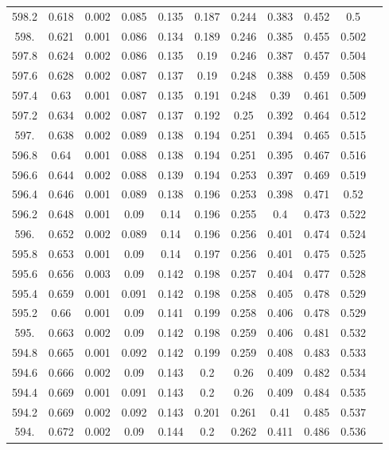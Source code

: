 \documentclass[12pt]{ctexart}
\numberwithin{equation}{section}
\begin{document}
\begin{longtable}{ccccccccccc}
598.2	&	0.618	&	0.002	&	0.085	&	0.135	&	0.187	&	0.244	&	0.383	&	0.452	&	0.5	\\
598.	&	0.621	&	0.001	&	0.086	&	0.134	&	0.189	&	0.246	&	0.385	&	0.455	&	0.502	\\
597.8	&	0.624	&	0.002	&	0.086	&	0.135	&	0.19	&	0.246	&	0.387	&	0.457	&	0.504	\\
597.6	&	0.628	&	0.002	&	0.087	&	0.137	&	0.19	&	0.248	&	0.388	&	0.459	&	0.508	\\
597.4	&	0.63	&	0.001	&	0.087	&	0.135	&	0.191	&	0.248	&	0.39	&	0.461	&	0.509	\\
597.2	&	0.634	&	0.002	&	0.087	&	0.137	&	0.192	&	0.25	&	0.392	&	0.464	&	0.512	\\
597.	&	0.638	&	0.002	&	0.089	&	0.138	&	0.194	&	0.251	&	0.394	&	0.465	&	0.515	\\
596.8	&	0.64	&	0.001	&	0.088	&	0.138	&	0.194	&	0.251	&	0.395	&	0.467	&	0.516	\\
596.6	&	0.644	&	0.002	&	0.088	&	0.139	&	0.194	&	0.253	&	0.397	&	0.469	&	0.519	\\
596.4	&	0.646	&	0.001	&	0.089	&	0.138	&	0.196	&	0.253	&	0.398	&	0.471	&	0.52	\\
596.2	&	0.648	&	0.001	&	0.09	&	0.14	&	0.196	&	0.255	&	0.4	&	0.473	&	0.522	\\
596.	&	0.652	&	0.002	&	0.089	&	0.14	&	0.196	&	0.256	&	0.401	&	0.474	&	0.524	\\
595.8	&	0.653	&	0.001	&	0.09	&	0.14	&	0.197	&	0.256	&	0.401	&	0.475	&	0.525	\\
595.6	&	0.656	&	0.003	&	0.09	&	0.142	&	0.198	&	0.257	&	0.404	&	0.477	&	0.528	\\
595.4	&	0.659	&	0.001	&	0.091	&	0.142	&	0.198	&	0.258	&	0.405	&	0.478	&	0.529	\\
595.2	&	0.66	&	0.001	&	0.09	&	0.141	&	0.199	&	0.258	&	0.406	&	0.478	&	0.529	\\
595.	&	0.663	&	0.002	&	0.09	&	0.142	&	0.198	&	0.259	&	0.406	&	0.481	&	0.532	\\
594.8	&	0.665	&	0.001	&	0.092	&	0.142	&	0.199	&	0.259	&	0.408	&	0.483	&	0.533	\\
594.6	&	0.666	&	0.002	&	0.09	&	0.143	&	0.2	&	0.26	&	0.409	&	0.482	&	0.534	\\
594.4	&	0.669	&	0.001	&	0.091	&	0.143	&	0.2	&	0.26	&	0.409	&	0.484	&	0.535	\\
594.2	&	0.669	&	0.002	&	0.092	&	0.143	&	0.201	&	0.261	&	0.41	&	0.485	&	0.537	\\
594.	&	0.672	&	0.002	&	0.09	&	0.144	&	0.2	&	0.262	&	0.411	&	0.486	&	0.536	\\

\end{longtable}
\end{document}
